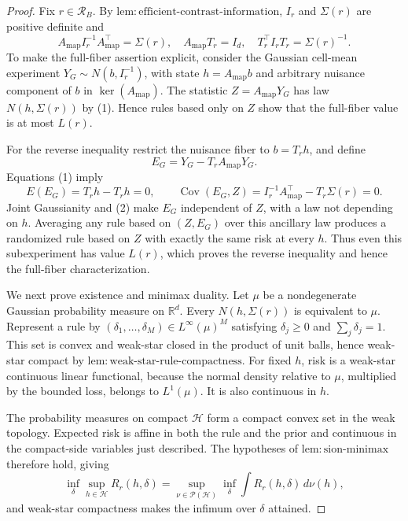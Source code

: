 \documentclass{article}
\begin{document}
\begin{proof}
Fix \(r\in\mathcal R_B\).  By \(\mathrm{lem:efficient\text{-}contrast\text{-}information}\), \(I_r\) and \(\Sigma(r)\) are positive definite and
\[
 A_{\mathrm{map}}I_r^{-1}A_{\mathrm{map}}^\top=\Sigma(r),\quad
 A_{\mathrm{map}}T_r=I_d,\quad T_r^\top I_rT_r=\Sigma(r)^{-1}.        \tag{1}
\]
To make the full-fiber assertion explicit, consider the Gaussian cell-mean experiment \(Y_G\sim N(b,I_r^{-1})\), with state \(h=A_{\mathrm{map}}b\) and arbitrary nuisance component of \(b\) in \(\ker(A_{\mathrm{map}})\).  The statistic \(Z=A_{\mathrm{map}}Y_G\) has law \(N(h,\Sigma(r))\) by (1).  Hence rules based only on \(Z\) show that the full-fiber value is at most \(L(r)\).

For the reverse inequality restrict the nuisance fiber to \(b=T_rh\), and define
\[
 E_G=Y_G-T_rA_{\mathrm{map}}Y_G.
\]
Equations (1) imply
\[
 E(E_G)=T_rh-T_rh=0,\qquad
 \operatorname{Cov}(E_G,Z)=I_r^{-1}A_{\mathrm{map}}^\top-T_r\Sigma(r)=0. \tag{2}
\]
Joint Gaussianity and (2) make \(E_G\) independent of \(Z\), with a law not depending on \(h\).  Averaging any rule based on \((Z,E_G)\) over this ancillary law produces a randomized rule based on \(Z\) with exactly the same risk at every \(h\).  Thus even this subexperiment has value \(L(r)\), which proves the reverse inequality and hence the full-fiber characterization.

We next prove existence and minimax duality.  Let \(\mu\) be a nondegenerate Gaussian probability measure on \(\mathbb R^d\).  Every \(N(h,\Sigma(r))\) is equivalent to \(\mu\).  Represent a rule by \((\delta_1,\ldots,\delta_M)\in L^\infty(\mu)^M\) satisfying \(\delta_j\geq0\) and \(\sum_j\delta_j=1\).  This set is convex and weak-star closed in the product of unit balls, hence weak-star compact by \(\mathrm{lem:weak\text{-}star\text{-}rule\text{-}compactness}\).  For fixed \(h\), risk is a weak-star continuous linear functional, because the normal density relative to \(\mu\), multiplied by the bounded loss, belongs to \(L^1(\mu)\).  It is also continuous in \(h\).

The probability measures on compact \(\mathcal H\) form a compact convex set in the weak topology.  Expected risk is affine in both the rule and the prior and continuous in the compact-side variables just described.  The hypotheses of \(\mathrm{lem:sion\text{-}minimax}\) therefore hold, giving
\[
 \inf_\delta\sup_{h\in\mathcal H}R_r(h,\delta)
 =\sup_{\nu\in\mathcal P(\mathcal H)}\inf_\delta
   \int R_r(h,\delta)\,d\nu(h),                                    \tag{3}
\]
and weak-star compactness makes the infimum over \(\delta\) attained.


\end{proof}
\end{document}
